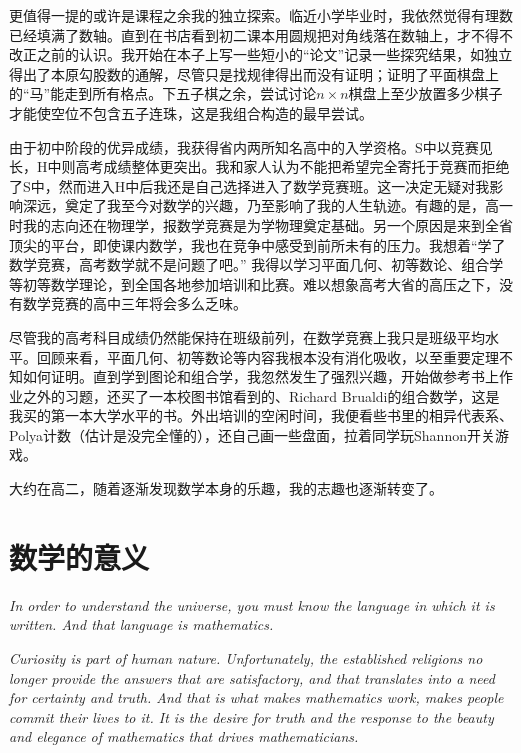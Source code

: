更值得一提的或许是课程之余我的独立探索。临近小学毕业时，我依然觉得有理数已经填满了数轴。直到在书店看到初二课本用圆规把对角线落在数轴上，才不得不改正之前的认识。我开始在本子上写一些短小的“论文”记录一些探究结果，如独立得出了本原勾股数的通解，尽管只是找规律得出而没有证明；证明了平面棋盘上的“马”能走到所有格点。下五子棋之余，尝试讨论$n\times n$棋盘上至少放置多少棋子才能使空位不包含五子连珠，这是我组合构造的最早尝试。

由于初中阶段的优异成绩，我获得省内两所知名高中的入学资格。S中以竞赛见长，H中则高考成绩整体更突出。我和家人认为不能把希望完全寄托于竞赛而拒绝了S中，然而进入H中后我还是自己选择进入了数学竞赛班。这一决定无疑对我影响深远，奠定了我至今对数学的兴趣，乃至影响了我的人生轨迹。有趣的是，高一时我的志向还在物理学，报数学竞赛是为学物理奠定基础。另一个原因是来到全省顶尖的平台，即使课内数学，我也在竞争中感受到前所未有的压力。我想着“学了数学竞赛，高考数学就不是问题了吧。” 我得以学习平面几何、初等数论、组合学等初等数学理论，到全国各地参加培训和比赛。难以想象高考大省的高压之下，没有数学竞赛的高中三年将会多么乏味。

尽管我的高考科目成绩仍然能保持在班级前列，在数学竞赛上我只是班级平均水平。回顾来看，平面几何、初等数论等内容我根本没有消化吸收，以至重要定理不知如何证明。直到学到图论和组合学，我忽然发生了强烈兴趣，开始做参考书上作业之外的习题，还买了一本校图书馆看到的、Richard Brualdi的组合数学，这是我买的第一本大学水平的书。外出培训的空闲时间，我便看些书里的相异代表系、Polya计数（估计是没完全懂的），还自己画一些盘面，拉着同学玩Shannon开关游戏。

大约在高二，随着逐渐发现数学本身的乐趣，我的志趣也逐渐转变了。




\section*{数学的意义}


\emph{In order to understand the universe, you must know the language in which it is written. And that language is mathematics.} 
\par {}

\emph{Curiosity is part of human nature. Unfortunately, the established religions no longer provide the answers that are satisfactory, and that translates into a need for certainty and truth. And that is what makes mathematics work, makes people commit their lives to it. It is the desire for truth and the response to the beauty and elegance of mathematics that drives mathematicians.}
\par {}

